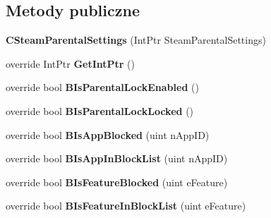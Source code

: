 \subsection*{Metody publiczne}
\begin{DoxyCompactItemize}
\item 
\mbox{\label{class_valve_1_1_steamworks_1_1_c_steam_parental_settings_a9db711e581cb1af2ba65a548a10fe576}} 
{\bfseries C\+Steam\+Parental\+Settings} (Int\+Ptr Steam\+Parental\+Settings)
\item 
\mbox{\label{class_valve_1_1_steamworks_1_1_c_steam_parental_settings_a2535a1b5c3f296690b4f427a0576f951}} 
override Int\+Ptr {\bfseries Get\+Int\+Ptr} ()
\item 
\mbox{\label{class_valve_1_1_steamworks_1_1_c_steam_parental_settings_a4abd446acce652b6d9ac18a3c3b820d2}} 
override bool {\bfseries B\+Is\+Parental\+Lock\+Enabled} ()
\item 
\mbox{\label{class_valve_1_1_steamworks_1_1_c_steam_parental_settings_a738e03d67b397bba1928b65ab1cb462d}} 
override bool {\bfseries B\+Is\+Parental\+Lock\+Locked} ()
\item 
\mbox{\label{class_valve_1_1_steamworks_1_1_c_steam_parental_settings_a0b1a05757a2fa98298678e06a527094f}} 
override bool {\bfseries B\+Is\+App\+Blocked} (uint n\+App\+ID)
\item 
\mbox{\label{class_valve_1_1_steamworks_1_1_c_steam_parental_settings_af780281982578713b2877ae3cd731279}} 
override bool {\bfseries B\+Is\+App\+In\+Block\+List} (uint n\+App\+ID)
\item 
\mbox{\label{class_valve_1_1_steamworks_1_1_c_steam_parental_settings_a11ef44f7258d5a7935d5b5601e823d40}} 
override bool {\bfseries B\+Is\+Feature\+Blocked} (uint e\+Feature)
\item 
\mbox{\label{class_valve_1_1_steamworks_1_1_c_steam_parental_settings_a99f4cd0cfe482df636493767cb726ca7}} 
override bool {\bfseries B\+Is\+Feature\+In\+Block\+List} (uint e\+Feature)
\end{DoxyCompactItemize}


